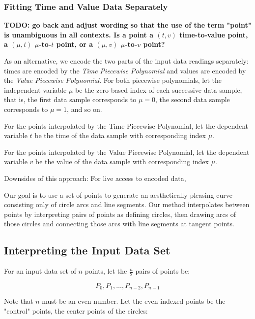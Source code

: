 \documentclass{article}
\begin{document}
\subsubsection{Fitting Time and Value Data Separately}
\textbf{TODO: go back and adjust wording so that the use of the term "point" is unambiguous in all contexts. Is a point a \((t,v)\) time-to-value point, a \((\mu,t)\) $\mu$-to-\(t\) point, or a \((\mu,v)\) $\mu$-to-\(v\) point?}

As an alternative, we encode the two parts of the input data readings separately: times are encoded by the \textit{Time Piecewise Polynomial} and values are encoded by the \textit{Value Piecewise Polynomial}. For both piecewise polynomials, let the independent variable $\mu$ be the zero-based index of each successive data sample, that is, the first data sample corresponds to $\mu = 0$, the second data sample corresponds to $\mu = 1$, and so on.



For the points interpolated by the Time Piecewise Polynomial, let the dependent variable \(t\) be the time of the data sample with corresponding index $\mu$.

For the points interpolated by the Value Piecewise Polynomial, let the dependent variable \(v\) be the value of the data sample with corresponding index $\mu$.

Downsides of this approach:
For live access to encoded data,




Our goal is to use a set of points to generate an aesthetically pleasing curve consisting only of circle arcs and line segments. Our method interpolates between points by interpreting pairs of points as defining circles, then drawing arcs of those circles and connecting those arcs with line segments at tangent points.

\newpage
\newpage
\mbox{} %


\subsection{Interpreting the Input Data Set}
For an input data set of \( n \) points, let the \( \frac{n}{2} \) pairs of points be:

\[ P_0, P_1, \ldots, P_{n-2}, P_{n-1} \]

Note that \( n \) must be an even number. Let the even-indexed points be the "control" points, the center points of the circles:
\end{document}
